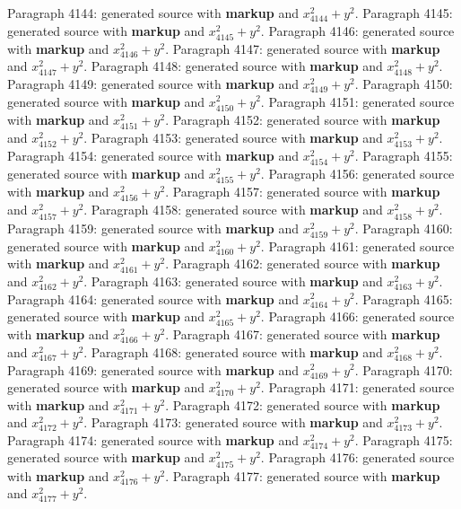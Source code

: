 \documentclass{article}
\begin{document}
Paragraph 4144: generated source with \textbf{markup} and $x_{4144}^2 + y^2$.
Paragraph 4145: generated source with \textbf{markup} and $x_{4145}^2 + y^2$.
Paragraph 4146: generated source with \textbf{markup} and $x_{4146}^2 + y^2$.
Paragraph 4147: generated source with \textbf{markup} and $x_{4147}^2 + y^2$.
Paragraph 4148: generated source with \textbf{markup} and $x_{4148}^2 + y^2$.
Paragraph 4149: generated source with \textbf{markup} and $x_{4149}^2 + y^2$.
Paragraph 4150: generated source with \textbf{markup} and $x_{4150}^2 + y^2$.
Paragraph 4151: generated source with \textbf{markup} and $x_{4151}^2 + y^2$.
Paragraph 4152: generated source with \textbf{markup} and $x_{4152}^2 + y^2$.
Paragraph 4153: generated source with \textbf{markup} and $x_{4153}^2 + y^2$.
Paragraph 4154: generated source with \textbf{markup} and $x_{4154}^2 + y^2$.
Paragraph 4155: generated source with \textbf{markup} and $x_{4155}^2 + y^2$.
Paragraph 4156: generated source with \textbf{markup} and $x_{4156}^2 + y^2$.
Paragraph 4157: generated source with \textbf{markup} and $x_{4157}^2 + y^2$.
Paragraph 4158: generated source with \textbf{markup} and $x_{4158}^2 + y^2$.
Paragraph 4159: generated source with \textbf{markup} and $x_{4159}^2 + y^2$.
Paragraph 4160: generated source with \textbf{markup} and $x_{4160}^2 + y^2$.
Paragraph 4161: generated source with \textbf{markup} and $x_{4161}^2 + y^2$.
Paragraph 4162: generated source with \textbf{markup} and $x_{4162}^2 + y^2$.
Paragraph 4163: generated source with \textbf{markup} and $x_{4163}^2 + y^2$.
Paragraph 4164: generated source with \textbf{markup} and $x_{4164}^2 + y^2$.
Paragraph 4165: generated source with \textbf{markup} and $x_{4165}^2 + y^2$.
Paragraph 4166: generated source with \textbf{markup} and $x_{4166}^2 + y^2$.
Paragraph 4167: generated source with \textbf{markup} and $x_{4167}^2 + y^2$.
Paragraph 4168: generated source with \textbf{markup} and $x_{4168}^2 + y^2$.
Paragraph 4169: generated source with \textbf{markup} and $x_{4169}^2 + y^2$.
Paragraph 4170: generated source with \textbf{markup} and $x_{4170}^2 + y^2$.
Paragraph 4171: generated source with \textbf{markup} and $x_{4171}^2 + y^2$.
Paragraph 4172: generated source with \textbf{markup} and $x_{4172}^2 + y^2$.
Paragraph 4173: generated source with \textbf{markup} and $x_{4173}^2 + y^2$.
Paragraph 4174: generated source with \textbf{markup} and $x_{4174}^2 + y^2$.
Paragraph 4175: generated source with \textbf{markup} and $x_{4175}^2 + y^2$.
Paragraph 4176: generated source with \textbf{markup} and $x_{4176}^2 + y^2$.
Paragraph 4177: generated source with \textbf{markup} and $x_{4177}^2 + y^2$.
\end{document}
